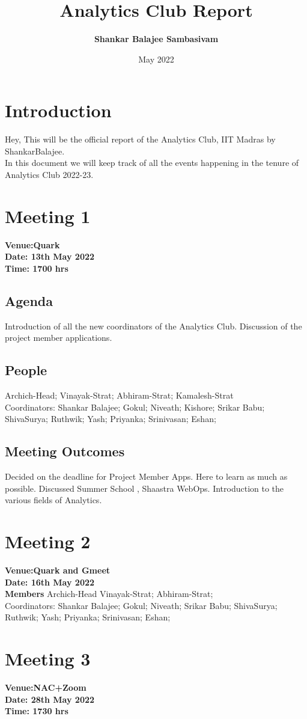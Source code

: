 \documentclass[11pt]{scrartcl}
\title{\textbf{Analytics Club Report}}
\author{\textbf{Shankar Balajee Sambasivam}}
\date{May 2022}
\begin{document}
\dylantitle

\section{Introduction}
Hey, This will be the official report of the Analytics Club, IIT Madras by ShankarBalajee.\\
In this document we will keep track of all the events happening in the tenure of Analytics Club 2022-23.\\
\section{Meeting 1}
\textbf{Venue:Quark}\\
\textbf{Date: 13th May 2022}\\
\textbf{Time: 1700 hrs}\\
\subsection{Agenda}
Introduction of all the new coordinators of the Analytics Club. Discussion of the project member applications.
\subsection{People}
Archich-Head;
Vinayak-Strat;
Abhiram-Strat;
Kamalesh-Strat\\
Coordinators:
Shankar Balajee;
Gokul;
Niveath;
Kishore;
Srikar Babu;
ShivaSurya;
Ruthwik;
Yash;
Priyanka;
Srinivasan;
Eshan;
\subsection{Meeting Outcomes}
Decided on the deadline for Project Member Apps. Here to learn as much as possible. Discussed Summer School , Shaastra WebOps. Introduction to the various fields of Analytics.
\section{Meeting 2}
\textbf{Venue:Quark and Gmeet}\\
\textbf{Date: 16th May 2022}\\
\textbf{Members}
Archich-Head
Vinayak-Strat;
Abhiram-Strat;\\
Coordinators:
Shankar Balajee;
Gokul;
Niveath;
Srikar Babu;
ShivaSurya;
Ruthwik;
Yash;
Priyanka;
Srinivasan;
Eshan;

\section{Meeting 3}
\textbf{Venue:NAC+Zoom}\\
\textbf{Date: 28th May 2022}\\
\textbf{Time: 1730 hrs}\\
\end{document}
